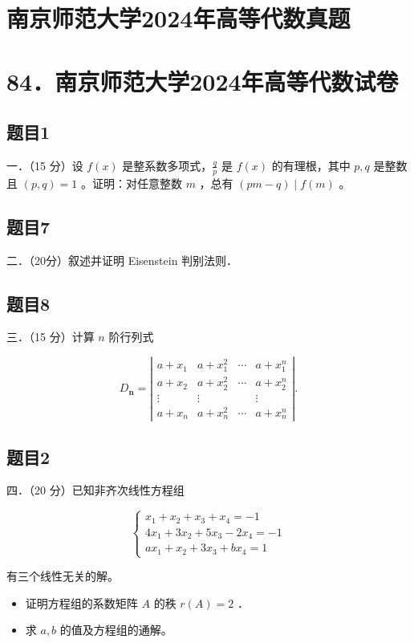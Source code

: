 \documentclass{article}
\begin{document}
\section*{南京师范大学2024年高等代数真题}
\section*{84．南京师范大学2024年高等代数试卷}

\subsection{题目1}
一．（15 分）设 \(f(x)\) 是整系数多项式，\(\frac{q}{p}\) 是 \(f(x)\) 的有理根，其中 \(p, q\) 是整数且 \((p, q)=1\) 。证明：对任意整数 \(m\) ，总有 \((p m-q) \mid f(m)\) 。

\subsection{题目7}
二．（20分）叙述并证明 Eisenstein 判别法则．

\subsection{题目8}
三．（15 分）计算 \(n\) 阶行列式

\[
D_{\mathbf{n}}=\left|\begin{array}{cccc}
a+x_{1} & a+x_{1}^{2} & \cdots & a+x_{1}^{n} \\
a+x_{2} & a+x_{2}^{2} & \cdots & a+x_{2}^{n} \\
\vdots & \vdots & & \vdots \\
a+x_{n} & a+x_{n}^{2} & \cdots & a+x_{n}^{n}
\end{array}\right| .
\]

\subsection{题目2}
四．（20 分）已知非齐次线性方程组

\[
\left\{\begin{array}{l}
x_{1}+x_{2}+x_{3}+x_{4}=-1 \\
4 x_{1}+3 x_{2}+5 x_{3}-2 x_{4}=-1 \\
a x_{1}+x_{2}+3 x_{3}+b x_{4}=1
\end{array}\right.
\]

有三个线性无关的解。

\begin{itemize}
  \item[（1）] 证明方程组的系数矩阵 \(A\) 的秩 \(r(A)=2\) ．
  \item[（2）] 求 \(a, b\) 的值及方程组的通解。
\end{itemize}
\end{document}
